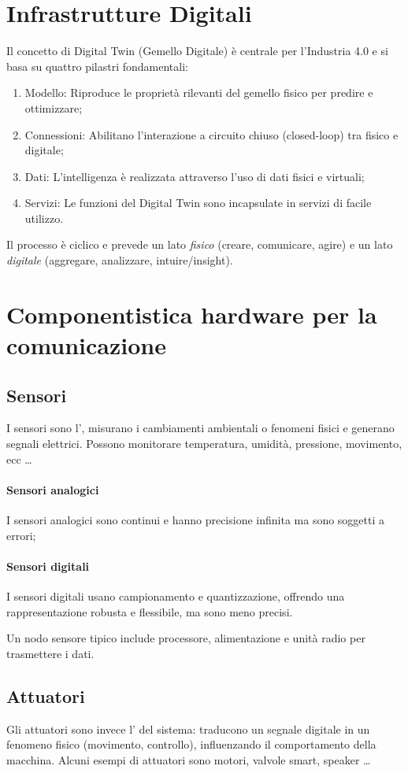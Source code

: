 %
%
\section{Infrastrutture Digitali}
Il concetto di Digital Twin (Gemello Digitale) è centrale per l'Industria 4.0 e si basa su quattro pilastri fondamentali:
\begin{enumerate}
    \item Modello: Riproduce le proprietà rilevanti del gemello fisico per predire e ottimizzare;
    \item Connessioni: Abilitano l'interazione a circuito chiuso (closed-loop) tra fisico e digitale;
    \item Dati: L'intelligenza è realizzata attraverso l'uso di dati fisici e virtuali;
    \item Servizi: Le funzioni del Digital Twin sono incapsulate in servizi di facile utilizzo.
\end{enumerate}

Il processo è ciclico e prevede un lato \emph{fisico} (creare, comunicare, agire) e un lato \emph{digitale} (aggregare, analizzare, intuire/insight).

%
\section{Componentistica hardware per la comunicazione}
%
\subsection{Sensori}
I sensori sono l', misurano i cambiamenti ambientali o fenomeni fisici e generano segnali elettrici. Possono monitorare temperatura, umidità, pressione, movimento, ecc \dots
%
\paragraph{Sensori analogici} I sensori analogici sono continui e hanno precisione infinita ma sono soggetti a errori;
%
\paragraph{Sensori digitali} I sensori digitali usano campionamento e quantizzazione, offrendo una rappresentazione robusta e flessibile, ma sono meno precisi.

Un nodo sensore tipico include processore, alimentazione e unità radio per trasmettere i dati.
%
\subsection{Attuatori}
Gli attuatori sono invece l' del sistema: traducono un segnale digitale in un fenomeno fisico (movimento, controllo), influenzando il comportamento della macchina. Alcuni esempi di attuatori sono motori, valvole smart, speaker \dots

